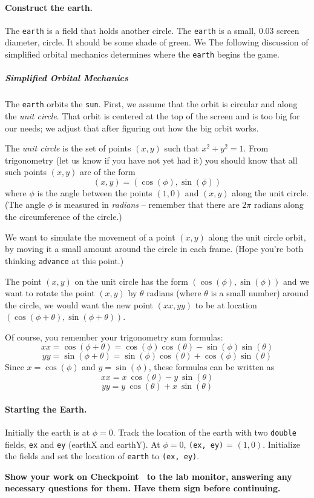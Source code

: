 \documentclass[12pt,twoside]{memoir}
\newenvironment{Checkpoint}[1]{%
\begin{Exercise}[name={Checkpoint},title={#1}]}{%
\end{Exercise}%
\textbf{Show your work on Checkpoint~\theExercise{} to the lab monitor, %
  answering any necessary questions for them.  Have them sign before continuing.}}
\begin{document}
\begin{Checkpoint}{The Firmament}
\paragraph{Construct the earth.}
The \texttt{earth} is a field that holds another circle. The
\texttt{earth} is a small, 0.03 screen diameter, circle. It should be
some shade of green. We The following discussion of simplified orbital
mechanics determines where the \texttt{earth} begins the game.

\subparagraph{Simplified Orbital Mechanics}
The \texttt{earth} orbits the \texttt{sun}. First, we assume that the
orbit is circular and along the \emph{unit circle}. That orbit is
centered at the top of the screen and is too big for our needs; we
adjust that after figuring out how the big orbit works.

The \emph{unit circle} is the set of points $(x, y)$ such that $x^2 +
y^2 = 1$. From trigonometry (let us know if you have not yet had it)
you should know that all such points $(x,y)$ are of the form
\[(x,y) = (\cos(\phi), \sin(\phi))\] where $\phi$ is the angle between
the points $(1,0)$ and $(x,y)$ along the unit circle.  (The angle
$\phi$ is measured in {\em radians} -- remember that there are $2\pi$
radians along the circumference of the circle.)

We want to simulate the movement of a point $(x,y)$ along the unit
circle orbit, by moving it a small amount around the circle in each
frame. (Hope you're both thinking \texttt{advance} at this point.)

The point $(x,y)$ on the unit circle has the form $(\cos(\phi),
\sin(\phi))$ and we want to rotate the point $(x,y)$ by $\theta$
radians (where $\theta$ is a small number) around the circle, we would
want the new point $(xx, yy)$ to be at location $(\cos(\phi+\theta),
\sin(\phi+\theta))$.

Of course, you remember your trigonometry sum formulas:
\[xx = \cos(\phi+\theta) =
  \cos(\phi)\cos(\theta) -
  \sin(\phi)\sin(\theta)\]
\[yy = \sin(\phi+\theta) =
  \sin(\phi)\cos(\theta) +
  \cos(\phi)\sin(\theta)\]
Since $x=\cos(\phi)$ and $y=\sin(\phi)$,
these formulas can be written as
\[xx =
  x\:\cos(\theta) -
  y\:\sin(\theta)\]
\[yy =
  y\:\cos(\theta) +
  x\:\sin(\theta)\]

\paragraph{Starting the Earth.}
Initially the earth is at $\phi = 0$. Track the location of the earth
with two \texttt{double} fields, \texttt{ex} and \texttt{ey} (earthX
and earthY). At $\phi = 0$, \texttt{(ex, ey)} = $(1, 0)$. Initialize
the fields and set the location of \texttt{earth} to \texttt{(ex, ey)}.
\end{Checkpoint}
\end{document}
